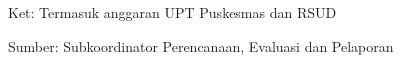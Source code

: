 
\vspace{2ex}
{\small Ket: Termasuk anggaran UPT Puskesmas dan RSUD}


\vfill
Sumber: Subkoordinator Perencanaan, Evaluasi dan Pelaporan\par 
